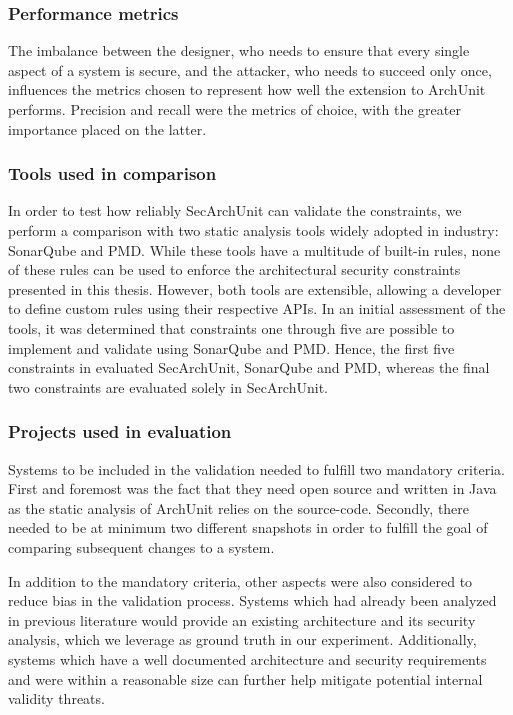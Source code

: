 \subsubsection{Performance metrics}
The imbalance between the designer, who needs to ensure that every single aspect of a system is secure, and the attacker, who needs to succeed only once, influences the metrics chosen to represent how well the extension to ArchUnit performs. Precision and recall were the metrics of choice, with the greater importance placed on the latter. 


\subsubsection{Tools used in comparison}\label{sec_tools_used_in_comparison} 
In order to test how reliably SecArchUnit can validate the constraints, we perform a comparison with two static analysis tools widely adopted in industry: SonarQube and PMD.
While these tools have a multitude of built-in rules, none of these rules can be used to enforce the architectural security constraints presented in this thesis. However, both tools are extensible, allowing a developer to define custom rules using their respective APIs.
In an initial assessment of the tools, it was determined that constraints one through five are possible to implement and validate using SonarQube and PMD. Hence, the first five constraints in evaluated SecArchUnit, SonarQube and PMD, whereas the final two constraints are evaluated solely in SecArchUnit.

\subsubsection{Projects used in evaluation}
Systems to be included in the validation needed to fulfill two mandatory criteria. First and foremost was the fact that they need open source and written in Java as the static analysis of ArchUnit relies on the source-code. Secondly, there needed to be at minimum two different snapshots in order to fulfill the goal of comparing subsequent changes to a system.  

In addition to the mandatory criteria, other aspects were also considered to reduce bias in the validation process. Systems which had already been analyzed in previous literature \cite{peldszus_secure_2019, abi-antoun_static_2009} would provide an existing architecture and its security analysis, which we leverage as ground truth in our experiment. Additionally, systems which have a well documented architecture and security requirements and were within a reasonable size can further help mitigate potential internal validity threats. 